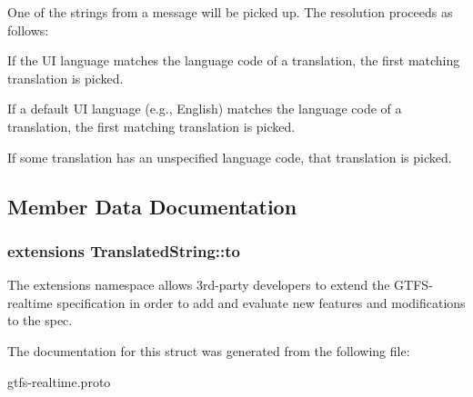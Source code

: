 One of the strings from a message will be picked up. The resolution proceeds as follows\+:
\begin{DoxyEnumerate}
\item If the UI language matches the language code of a translation, the first matching translation is picked.
\item If a default UI language (e.\+g., English) matches the language code of a translation, the first matching translation is picked.
\item If some translation has an unspecified language code, that translation is picked. 
\end{DoxyEnumerate}

\subsection{Member Data Documentation}
\subsubsection[{\texorpdfstring{to}{to}}]{\setlength{\rightskip}{0pt plus 5cm}extensions Translated\+String\+::to}\hypertarget{structTranslatedString_a79fd182a0215dcc9476e4af4cb8beef5}{}\label{structTranslatedString_a79fd182a0215dcc9476e4af4cb8beef5}


The extensions namespace allows 3rd-\/party developers to extend the G\+T\+F\+S-\/realtime specification in order to add and evaluate new features and modifications to the spec. 



The documentation for this struct was generated from the following file\+:\begin{DoxyCompactItemize}
\item 
gtfs-\/realtime.\+proto\end{DoxyCompactItemize}
